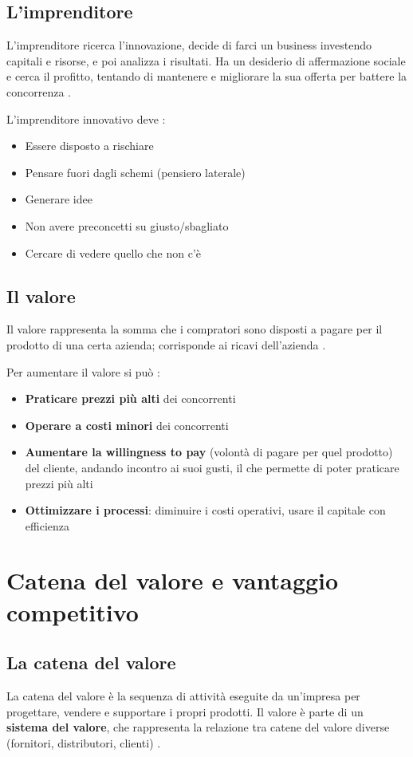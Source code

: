 \documentclass[12pt,a4paper]{article}
\begin{document}
\subsection{L'imprenditore}
L'imprenditore ricerca l'innovazione, decide di farci un business investendo capitali e risorse, e poi analizza i risultati. Ha un desiderio di affermazione sociale e cerca il profitto, tentando di mantenere e migliorare la sua offerta per battere la concorrenza .

L'imprenditore innovativo deve :
\begin{itemize}
    \item Essere disposto a rischiare
    \item Pensare fuori dagli schemi (pensiero laterale)
    \item Generare idee
    \item Non avere preconcetti su giusto/sbagliato
    \item Cercare di vedere quello che non c'è
\end{itemize}

\subsection{Il valore}
Il valore rappresenta la somma che i compratori sono disposti a pagare per il prodotto di una certa azienda; corrisponde ai ricavi dell'azienda .

Per aumentare il valore si può :
\begin{itemize}
    \item \textbf{Praticare prezzi più alti} dei concorrenti
    \item \textbf{Operare a costi minori} dei concorrenti
    \item \textbf{Aumentare la willingness to pay} (volontà di pagare per quel prodotto) del cliente, andando incontro ai suoi gusti, il che permette di poter praticare prezzi più alti
    \item \textbf{Ottimizzare i processi}: diminuire i costi operativi, usare il capitale con efficienza
\end{itemize}

\section{Catena del valore e vantaggio competitivo}

\subsection{La catena del valore}
La catena del valore è la sequenza di attività eseguite da un'impresa per progettare, vendere e supportare i propri prodotti. Il valore è parte di un \textbf{sistema del valore}, che rappresenta la relazione tra catene del valore diverse (fornitori, distributori, clienti) .
\end{document}
